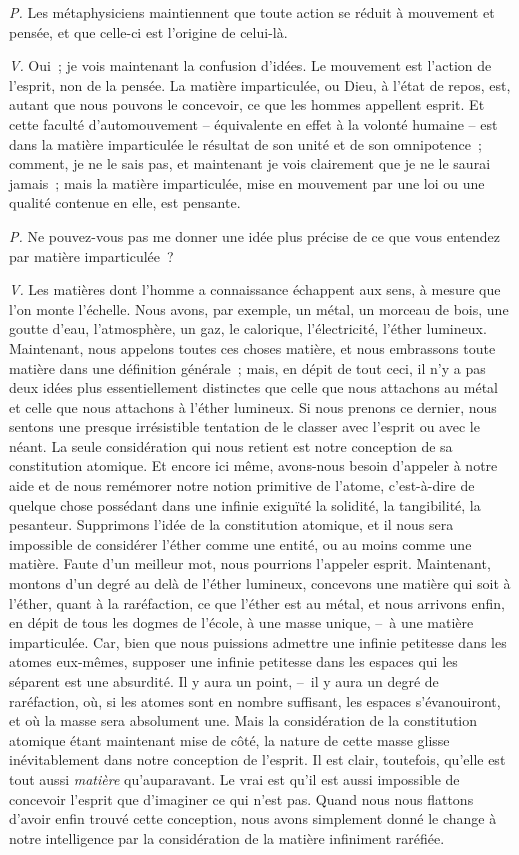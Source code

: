 \documentclass[french,twoside]{book} %
\begin{document}
\emph{P.} Les métaphysiciens maintiennent que toute action se réduit à mouvement et pensée, et que celle-ci est l’origine de celui-là.\par
\emph{V.} Oui ; je vois maintenant la confusion d’idées. Le mouvement est l’action de l’esprit, non de la pensée. La matière imparticulée, ou Dieu, à l’état de repos, est, autant que nous pouvons le concevoir, ce que les hommes appellent esprit. Et cette faculté d’automouvement – équivalente en effet à la volonté humaine – est dans la matière imparticulée le résultat de son unité et de son omnipotence ; comment, je ne le sais pas, et maintenant je vois clairement que je ne le saurai jamais ; mais la matière imparticulée, mise en mouvement par une loi ou une qualité contenue en elle, est pensante.\par
\emph{P.} Ne pouvez-vous pas me donner une idée plus précise de ce que vous entendez par matière imparticulée ?\par
\emph{V.} Les matières dont l’homme a connaissance échappent aux sens, à mesure que l’on monte l’échelle. Nous avons, par exemple, un métal, un morceau de bois, une goutte d’eau, l’atmosphère, un gaz, le calorique, l’électricité, l’éther lumineux. Maintenant, nous appelons toutes ces choses matière, et nous embrassons toute matière dans une définition générale ; mais, en dépit de tout ceci, il n’y a pas deux idées plus essentiellement distinctes que celle que nous attachons au métal et celle que nous attachons à l’éther lumineux. Si nous prenons ce dernier, nous sentons une presque irrésistible tentation de le classer avec l’esprit ou avec le néant. La seule considération qui nous retient est notre conception de sa constitution atomique. Et encore ici même, avons-nous besoin d’appeler à notre aide et de nous remémorer notre notion primitive de l’atome, c’est-à-dire de quelque chose possédant dans une infinie exiguïté la solidité, la tangibilité, la pesanteur. Supprimons l’idée de la constitution atomique, et il nous sera impossible de considérer l’éther comme une entité, ou au moins comme une matière. Faute d’un meilleur mot, nous pourrions l’appeler esprit. Maintenant, montons d’un degré au delà de l’éther lumineux, concevons une matière qui soit à l’éther, quant à la raréfaction, ce que l’éther est au métal, et nous arrivons enfin, en dépit de tous les dogmes de l’école, à une masse unique, – à une matière imparticulée. Car, bien que nous puissions admettre une infinie petitesse dans les atomes eux-mêmes, supposer une infinie petitesse dans les espaces qui les séparent est une absurdité. Il y aura un point, – il y aura un degré de raréfaction, où, si les atomes sont en nombre suffisant, les espaces s’évanouiront, et où la masse sera absolument une. Mais la considération de la constitution atomique étant maintenant mise de côté, la nature de cette masse glisse inévitablement dans notre conception de l’esprit. Il est clair, toutefois, qu’elle est tout aussi \emph{matière} qu’auparavant. Le vrai est qu’il est aussi impossible de concevoir l’esprit que d’imaginer ce qui n’est pas. Quand nous nous flattons d’avoir enfin trouvé cette conception, nous avons simplement donné le change à notre intelligence par la considération de la matière infiniment raréfiée.\par
\end{document}
